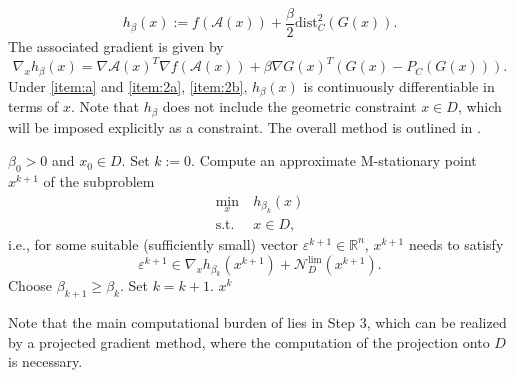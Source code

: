 \documentclass[11pt,a4paper,reqno]{amsart}
\begin{document}
{\begin{equation}\label{Eq:h}
h_{\beta}(x):=f(\mathcal A(x))+\frac{\beta}{2}\text{dist}_C^2(G(x)).
 \end{equation}
The associated gradient is given by
\begin{equation*}
  \nabla_x h_{\beta}(x)=\nabla \mathcal A(x)^T \nabla f(\mathcal A(x)) +\beta \nabla G(x)^T \left(G(x)-P_C(G(x))\right).
\end{equation*}
Under  \ref{item:a} and  \ref{item:2a}, \ref{item:2b}, $h_{\beta}(x)$ is continuously differentiable in terms of $x$. Note that $h_{\beta}$ does not include the geometric constraint $x\in D$, which will be imposed explicitly as a constraint. The overall method is outlined in .

\begin{algorithm}[H]\caption{Constraint dissolving inexact penalty method}%
	\label{Alg:IP}
    \small
	\begin{algorithmic}[1]
		\REQUIRE $\beta_0>0$ and $x_0\in D$.
            \STATE Set $k:=0$.
        \STATE Compute an approximate M-stationary point $x^{k+1}$ of the subproblem
        \begin{equation}\label{Eq:subph}
\begin{aligned}
  \min_{x} \ & h_{\beta_k}(x) \\ 
  \text{s.t.} \ & x\in D,
\end{aligned}
\end{equation}
i.e., for some suitable (sufficiently small) vector $\varepsilon^{k+1}\in \mathbb R^n$, $x^{k+1}$ needs to satisfy
            \begin{equation}\label{Eq:subp}
      \varepsilon^{k+1}\in \nabla_x h_{\beta_k}(x^{k+1})+\mathcal N_D^{\text{lim}}(x^{k+1}).
            \end{equation}
            \STATE Choose $\beta_{k+1}\geq\beta_k$. Set $k=k+1$.
        \ENDWHILE
		\RETURN $x^k$
	\end{algorithmic}
\end{algorithm}
Note that the main computational burden of  lies in Step 3, which can be realized by a projected gradient method, where the computation of the projection onto $D$ is necessary.

}
\end{document}
